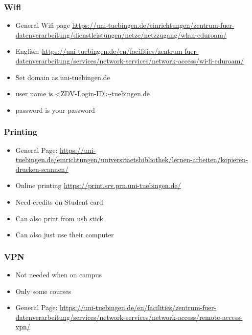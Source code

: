 \documentclass[aspectratio=169,hyperref={unicode}]{beamer}
\begin{document}
\begin{frame}
  \frametitle{Wifi}


  \begin{itemize}
          \item
  General Wifi page \url{https://uni-tuebingen.de/einrichtungen/zentrum-fuer-datenverarbeitung/dienstleistungen/netze/netzzugang/wlan-eduroam/}
          \item
  English: \url{https://uni-tuebingen.de/en/facilities/zentrum-fuer-datenverarbeitung/services/network-services/network-access/wi-fi-eduroam/}
          \item Set domain as uni-tuebingen.de
           \item user name is <ZDV-Login-ID>\@uni-tuebingen.de
          \item password is your password
  \end{itemize}
\end{frame}

\begin{frame}
  \frametitle{Printing}
  \begin{itemize}
  \item General Page:  \url{https://uni-tuebingen.de/einrichtungen/universitaetsbibliothek/lernen-arbeiten/kopieren-drucken-scannen/}
          \item Online printing \url{https://print.srv.prn.uni-tuebingen.de/}
          \item Need credits on Student card
          \item Can also print from usb stick
          \item Can also just use their computer
  \end{itemize}
\end{frame}

\begin{frame}
  \frametitle{VPN}
  \begin{itemize}
          \item Not needed when on campus
          \item Only some courses

  \item General Page:  \url{https://uni-tuebingen.de/en/facilities/zentrum-fuer-datenverarbeitung/services/network-services/network-access/remote-access-vpn/}
  \end{itemize}
\end{frame}
\end{document}

